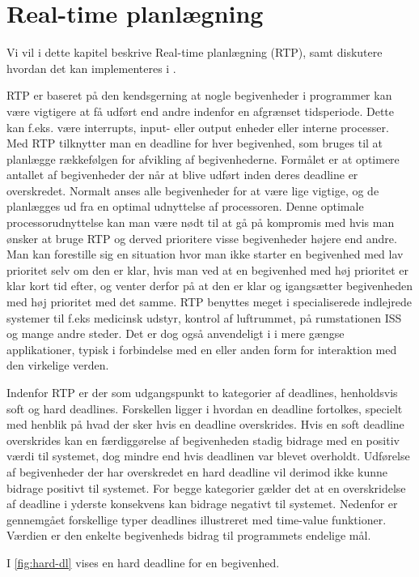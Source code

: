 \chapter{Real-time planlægning}
Vi vil i dette kapitel beskrive Real-time planlægning (RTP), samt diskutere hvordan det kan implementeres i \pycsp. 

RTP er baseret på den kendsgerning at nogle begivenheder i programmer kan være vigtigere at få udført end andre indenfor en afgrænset tidsperiode. Dette kan f.eks. være interrupts, input- eller output enheder eller interne processer. Med RTP tilknytter man en deadline for hver begivenhed, som bruges til at planlægge rækkefølgen for afvikling af begivenhederne. Formålet er at optimere antallet af begivenheder der når at blive udført inden deres deadline er overskredet. Normalt anses alle begivenheder for at være lige vigtige, og de planlægges ud fra en optimal udnyttelse af processoren. Denne optimale processorudnyttelse kan man være nødt til at gå på kompromis med hvis man ønsker at bruge RTP og derved prioritere visse begivenheder højere end andre. Man kan forestille sig en situation hvor man ikke starter en begivenhed med lav prioritet selv om den er klar, hvis man ved at en begivenhed med høj prioritet er klar kort tid efter, og venter derfor på at den er klar og igangsætter begivenheden med høj prioritet med det samme. 
RTP benyttes meget i specialiserede indlejrede systemer til f.eks medicinsk udstyr, kontrol af luftrummet, på rumstationen ISS\cite{Audsley1990} og mange andre steder. Det er dog også anvendeligt i i mere gængse applikationer, typisk i forbindelse med en eller anden form for interaktion med den virkelige verden. 

Indenfor RTP er der som udgangspunkt to kategorier af deadlines, henholdsvis soft og hard deadlines. Forskellen ligger i hvordan en deadline fortolkes, specielt med henblik på hvad der sker hvis en deadline overskrides. Hvis en soft deadline overskrides kan en færdiggørelse af begivenheden stadig bidrage med en positiv værdi til systemet, dog mindre end hvis deadlinen var blevet overholdt. Udførelse af begivenheder der har overskredet en hard deadline vil derimod ikke kunne bidrage positivt til systemet. For begge kategorier gælder det at en overskridelse af deadline i yderste konsekvens kan bidrage negativt til systemet. Nedenfor er gennemgået forskellige typer deadlines illustreret med time-value funktioner. Værdien er den enkelte begivenheds bidrag til programmets endelige mål. 

I \cref{fig:hard-dl} vises en hard deadline for en begivenhed. 

